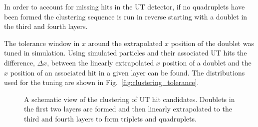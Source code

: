 In order to account for missing hits in the UT detector, if no quadruplets have been formed the clustering sequence is run in reverse starting with a doublet in the third and fourth layers.
 
The tolerance window in $x$ around the extrapolated $x$ position of the doublet was tuned in simulation. Using simulated particles and their associated UT hits the difference, $\Delta x$, between the linearly extrapolated $x$ position of a doublet and the $x$ position of an associated hit in a given layer can be found. The distributions used for the tuning are shown in Fig.~\ref{fig:clustering_tolerance}.

\begin{figure}[!tb]
 \begin{center}

\caption{A schematic view of the clustering of UT hit candidates. Doublets in the first two layers are formed and then linearly extrapolated to the third and fourth layers to form triplets and quadruplets.}
\label{fig:clustering}
\end{center}
\end{figure}

